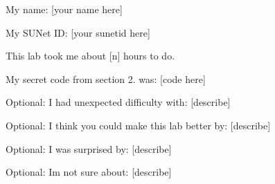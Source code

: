 My name\+: \mbox{[}your name here\mbox{]}

My S\+U\+Net ID\+: \mbox{[}your sunetid here\mbox{]}

This lab took me about \mbox{[}n\mbox{]} hours to do.

My secret code from section 2. was\+: \mbox{[}code here\mbox{]}


\begin{DoxyItemize}
\item Optional\+: I had unexpected difficulty with\+: \mbox{[}describe\mbox{]}
\item Optional\+: I think you could make this lab better by\+: \mbox{[}describe\mbox{]}
\item Optional\+: I was surprised by\+: \mbox{[}describe\mbox{]}
\item Optional\+: I\textquotesingle{}m not sure about\+: \mbox{[}describe\mbox{]} 
\end{DoxyItemize}
